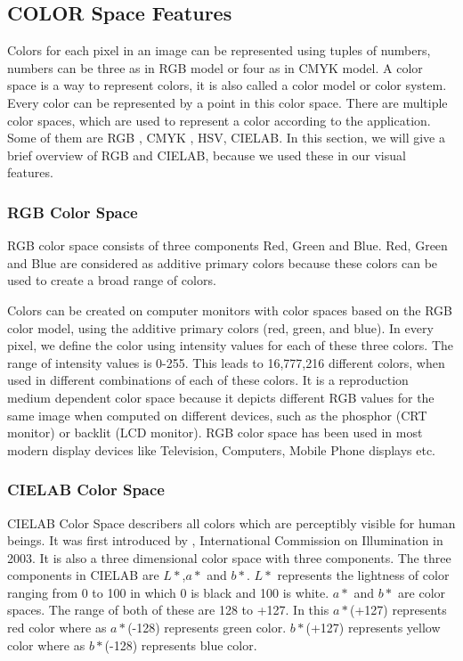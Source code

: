 \subsection{COLOR Space Features}
Colors for each pixel in an image can be represented using tuples of numbers, numbers can be three as in RGB model or four as in CMYK 
model. A color space is a way to represent colors, it is also called a color model or color system. Every color can be represented by a point in this color space. There are multiple color spaces, which are used to represent a color according to the application. Some of them are RGB , CMYK , HSV, CIELAB. In this section, we will give a brief overview of RGB and CIELAB, because we used these in our visual features.

\subsubsection*{RGB Color Space}
RGB color space consists of three components Red, Green and Blue. Red, Green and Blue are considered as additive primary colors 
because these colors can be used to create a broad range of colors. 

Colors can be created on computer monitors with color spaces based on the RGB color model, using the additive primary colors (red, green, and blue). In every pixel, we define the color using intensity values for each of these three colors. The range of intensity values is 0-255. This leads to 16,777,216 different colors, when used in different combinations of each of these colors. It is a reproduction medium dependent color space because it depicts different RGB values for the same image when computed on different devices, such as the phosphor (CRT monitor) or backlit (LCD monitor). RGB color space has been used in most modern display devices like Television, Computers, Mobile Phone displays etc.

\subsubsection*{CIELAB Color Space}
CIELAB Color Space describers all colors which are perceptibly visible for human beings. It was first introduced by \citet*{CIELAB},
International Commission on Illumination in 2003. It is also a three dimensional color space with three components. The three components in CIELAB are $L*$,$ a*$ and $b*$. $L*$ represents the lightness of color ranging from 0 to 100 in which 0 is black and 100 is white. 
$a*$ and $b*$ are color spaces. The range of both of these are 128 to +127. In this $a*$(+127) represents red color where as 
$a*$(-128) represents green color. $b*$(+127) represents yellow color where as $b*$(-128) represents blue color. 

